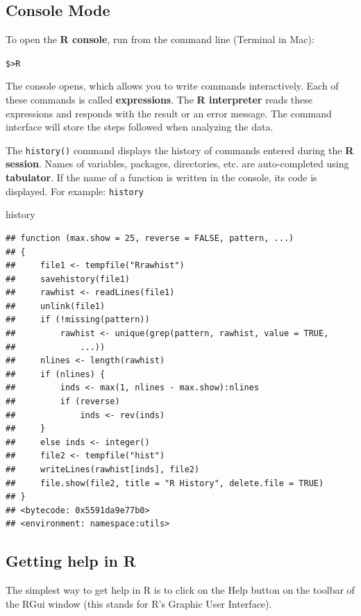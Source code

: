 \documentclass[
]{book}
\newenvironment{Shaded}{\begin{snugshade}}{\end{snugshade}}
\newcommand{\NormalTok}[1]{#1}
\theoremstyle{definition}
\theoremstyle{definition}
\theoremstyle{definition}
\theoremstyle{definition}
\theoremstyle{remark}
\begin{document}
\hypertarget{console-mode}{%
\subsection{Console Mode}\label{console-mode}}

To open the \textbf{R console}, run from the command line (Terminal in Mac):

\texttt{\$\textgreater{}R}

The console opens, which allows you to write commands interactively. Each of these commands is called \textbf{expressions}. The \textbf{R interpreter} reads these expressions and responds with the result or an error message. The command interface will store the steps followed when analyzing the data.

The \texttt{history()} command displays the history of commands entered during the \textbf{R session}. Names of variables, packages, directories, etc. are auto-completed using \textbf{tabulator}. If the name of a function is written in the console, its code is displayed. For example: \texttt{history}

\begin{Shaded}
\begin{Highlighting}[]
\NormalTok{history}
\end{Highlighting}
\end{Shaded}

\begin{verbatim}
## function (max.show = 25, reverse = FALSE, pattern, ...) 
## {
##     file1 <- tempfile("Rrawhist")
##     savehistory(file1)
##     rawhist <- readLines(file1)
##     unlink(file1)
##     if (!missing(pattern)) 
##         rawhist <- unique(grep(pattern, rawhist, value = TRUE, 
##             ...))
##     nlines <- length(rawhist)
##     if (nlines) {
##         inds <- max(1, nlines - max.show):nlines
##         if (reverse) 
##             inds <- rev(inds)
##     }
##     else inds <- integer()
##     file2 <- tempfile("hist")
##     writeLines(rawhist[inds], file2)
##     file.show(file2, title = "R History", delete.file = TRUE)
## }
## <bytecode: 0x5591da9e77b0>
## <environment: namespace:utils>
\end{verbatim}

\hypertarget{getting-help-in-r}{%
\subsection{Getting help in R}\label{getting-help-in-r}}

The simplest way to get help in R is to click on the Help button on the toolbar of the RGui window (this stands for R's Graphic User Interface).
\end{document}

